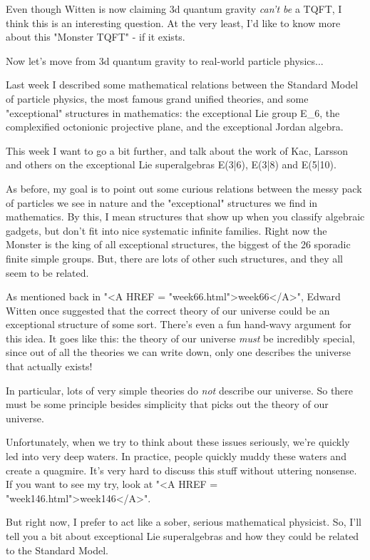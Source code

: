Even though Witten is now claiming 3d quantum gravity \emph{can't be}
a TQFT, I think this is an interesting question.  At the very 
least, I'd like to know more about this "Monster TQFT" - if it 
exists.

Now let's move from 3d quantum gravity to real-world particle
physics...

Last week I described some mathematical relations between the 
Standard Model of particle physics, the most famous grand unified 
theories, and some "exceptional" structures in mathematics: the 
exceptional Lie group E_{6}, the complexified octonionic projective 
plane, and the exceptional Jordan algebra.  

This week I want to go a bit further, and talk about the work 
of Kac, Larsson and others on the exceptional Lie superalgebras 
E(3|6), E(3|8) and E(5|10).  

As before, my goal is to point out some curious relations between 
the messy pack of particles we see in nature and the "exceptional" 
structures we find in mathematics.  By this, I mean structures 
that show up when you classify algebraic gadgets, but don't fit 
into nice systematic infinite families.  Right now the Monster
is the king of all exceptional structures, the biggest of the 
26 sporadic finite simple groups.  But, there are lots of other
such structures, and they all seem to be related.

As mentioned back in "<A HREF = "week66.html">week66</A>",
Edward Witten once suggested that the correct theory of our universe
could be an exceptional structure of some sort.  There's even a fun
hand-wavy argument for this idea.  It goes like this: the theory of
our universe \emph{must} be incredibly special, since out of all the
theories we can write down, only one describes the universe that
actually exists!

In particular, lots of very simple theories do \emph{not} describe our 
universe.  So there must be some principle besides simplicity that
picks out the theory of our universe.

Unfortunately, when we try to think about these issues seriously, 
we're quickly led into very deep waters.  In practice, people 
quickly muddy these waters and create a quagmire.  It's very 
hard to discuss this stuff without uttering nonsense.  If you want
to see my try, look at "<A HREF = "week146.html">week146</A>".  

But right now, I prefer to act like a sober, serious mathematical 
physicist.  So, I'll tell you a bit about exceptional Lie 
superalgebras and how they could be related to the Standard Model.

